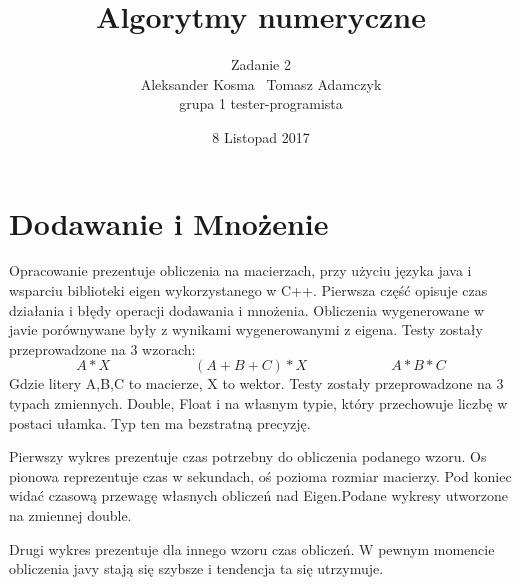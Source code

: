 \documentclass[8pt]{article}
\title{Algorytmy numeryczne}
\author{Zadanie 2 \\ Aleksander Kosma \ Tomasz Adamczyk\\grupa 1 tester-programista}
\date{8 Listopad 2017}
\begin{document}
\maketitle 

\section{Dodawanie i Mnożenie}

Opracowanie prezentuje obliczenia na macierzach, przy użyciu języka java i wsparciu biblioteki eigen 
wykorzystanego w C++.
Pierwsza część opisuje czas działania i błędy operacji dodawania i mnożenia.
Obliczenia wygenerowane w javie porównywane były z wynikami wygenerowanymi z eigena.
Testy zostały przeprowadzone na 3 wzorach:
$$A * X\qquad \qquad \qquad  (A+B+C)*X \qquad \qquad \qquad A*B*C$$
Gdzie litery A,B,C to macierze, X to wektor.
Testy zostały przeprowadzone na 3 typach zmiennych. Double, Float i na własnym typie, który przechowuje
liczbę w postaci ułamka. Typ ten ma bezstratną precyzję.

Pierwszy wykres prezentuje czas potrzebny do obliczenia podanego wzoru. Os pionowa reprezentuje czas w sekundach, oś pozioma rozmiar macierzy. Pod koniec widać czasową przewagę własnych obliczeń nad Eigen.Podane wykresy utworzone na zmiennej double.\\
\begin{center}
\end{center}

Drugi wykres prezentuje dla innego wzoru czas obliczeń. W pewnym momencie obliczenia javy stają się szybsze
i tendencja ta się utrzymuje.
\end{document}
